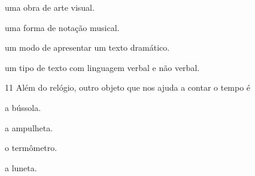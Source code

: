 \begin{minipage}{.5\textwidth}
\begin{escolha}
\item uma obra de arte visual.
  
\item uma forma de notação musical.
  
\item um modo de apresentar um texto dramático.
  
\item um tipo de texto com linguagem verbal e não verbal.
  
\end{escolha}
\end{minipage}

\pagebreak
\num{11}
Além do relógio, outro objeto que nos ajuda a contar o tempo é


\begin{minipage}{0.5\textwidth}
\begin{escolha}
\item a bússola.

\item a ampulheta.

\item o termômetro.

\item a luneta.
\end{escolha}
\end{minipage}

